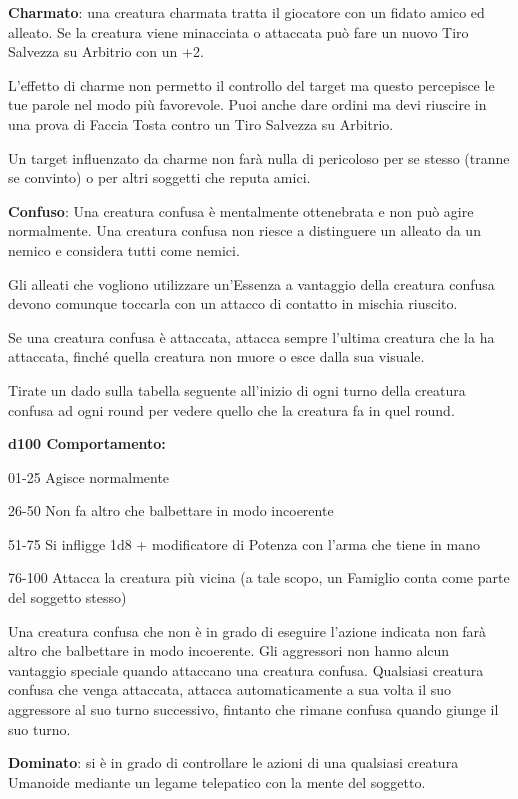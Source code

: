 \documentclass[a4paper,11pt,twoside,openany]{book}
\begin{document}
\textbf{Charmato}: una creatura charmata tratta il giocatore con un fidato amico ed alleato. Se la creatura viene minacciata o attaccata può fare un nuovo Tiro Salvezza su Arbitrio con un +2.

L'effetto di charme non permetto il controllo del target ma questo percepisce le tue parole nel modo più favorevole. Puoi anche dare ordini ma devi riuscire in una prova di Faccia Tosta contro un Tiro Salvezza su Arbitrio.

Un target influenzato da charme non farà nulla di pericoloso per se stesso (tranne se convinto) o per altri soggetti che reputa amici.

\textbf{Confuso}: Una creatura confusa è mentalmente ottenebrata e non può agire normalmente. Una creatura confusa non riesce a distinguere un alleato da un nemico e considera tutti come nemici.

Gli alleati che vogliono utilizzare un'Essenza a vantaggio della creatura confusa devono comunque toccarla con un attacco di contatto in mischia riuscito.

Se una creatura confusa è attaccata, attacca sempre l'ultima creatura che la ha attaccata, finché quella creatura non muore o esce dalla sua visuale.

Tirate un dado sulla tabella seguente all'inizio di ogni turno della
creatura confusa ad ogni round per vedere quello che la creatura fa
in quel round.

\textbf{d100 Comportamento:}

01-25 Agisce normalmente

26-50 Non fa altro che balbettare in modo incoerente

51-75 Si infligge 1d8 + modificatore di Potenza con l'arma che tiene in mano

76-100 Attacca la creatura più vicina (a tale scopo, un Famiglio conta come parte del soggetto stesso)

Una creatura confusa che non è in grado di eseguire l'azione indicata non farà altro che balbettare in modo incoerente. Gli aggressori non hanno alcun vantaggio speciale quando attaccano una creatura confusa. Qualsiasi creatura confusa che venga attaccata, attacca automaticamente a sua volta il suo aggressore al suo turno successivo, fintanto che rimane confusa quando giunge il suo turno.

\textbf{Dominato}: si è in grado di controllare le azioni di una qualsiasi creatura Umanoide mediante un legame telepatico con la mente del soggetto.
\end{document}
